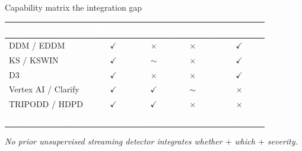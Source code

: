 \documentclass[aspectratio=169,10pt,t,xcolor={table}]{beamer}
\begin{document}
\begin{frame}{Capability matrix \textbar{} the integration gap}
\vspace{0.2em}
\centering
{}

\vspace{0.5em}
\centering
\renewcommand{\arraystretch}{1.25}
\setlength{\tabcolsep}{8pt}
{\footnotesize
\begin{tabular}{@{}>{\raggedright\arraybackslash}p{3.6cm} c c c c@{}}
\toprule
\rowcolor{ink!90}
\textcolor{white}{\textbf{Approach}} & \textcolor{white}{\textbf{Whether}} &
\textcolor{white}{\textbf{Which}}    & \textcolor{white}{\textbf{Severity}}  &
\textcolor{white}{\textbf{Streaming}} \\
\midrule
DDM / EDDM          & {\color{emerald}$\checkmark$} & {\color{crimson}$\times$} & {\color{crimson}$\times$} & {\color{emerald}$\checkmark$} \\
KS / KSWIN          & {\color{emerald}$\checkmark$} & {\color{gold!70!black}$\sim$} & {\color{crimson}$\times$} & {\color{emerald}$\checkmark$} \\
D3                  & {\color{emerald}$\checkmark$} & {\color{crimson}$\times$} & {\color{crimson}$\times$} & {\color{emerald}$\checkmark$} \\
Vertex AI / Clarify & {\color{emerald}$\checkmark$} & {\color{emerald}$\checkmark$} & {\color{gold!70!black}$\sim$} & {\color{crimson}$\times$} \\
TRIPODD / HDPD      & {\color{emerald}$\checkmark$} & {\color{emerald}$\checkmark$} & {\color{crimson}$\times$} & {\color{crimson}$\times$} \\
\midrule
\rowcolor{cobalt!88}
\textcolor{white}{\textbf{EADD (this work)}} &
\textcolor{white}{$\checkmark$} & \textcolor{white}{$\checkmark$} &
\textcolor{white}{$\checkmark$} & \textcolor{white}{$\checkmark$} \\
\bottomrule
\end{tabular}}

\vspace{0.6em}
{\scriptsize\color{graphite}\itshape No prior unsupervised streaming detector integrates \emph{whether} $+$ \emph{which} $+$ \emph{severity}.}
\end{frame}
\end{document}
